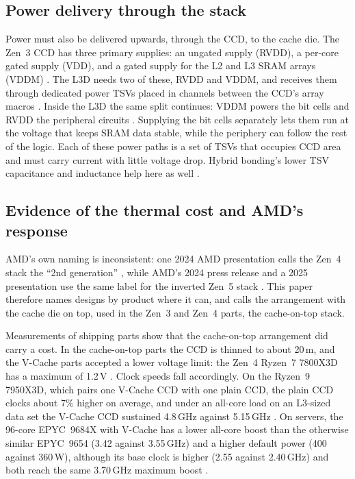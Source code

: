 \subsection{Power delivery through the stack}
Power must also be delivered upwards, through the CCD, to the cache die. The Zen~3 CCD has three primary supplies: an ungated supply (RVDD), a per-core gated supply (VDD), and a gated supply for the L2 and L3 SRAM arrays (VDDM) \cite[slide~23]{wuu2022vcache}. The L3D needs two of these, RVDD and VDDM, and receives them through dedicated power TSVs placed in channels between the CCD's array macros \cite[slide~24]{wuu2022vcache}. Inside the L3D the same split continues: VDDM powers the bit cells and RVDD the peripheral circuits \cite[slide~25]{wuu2022vcache}. Supplying the bit cells separately lets them run at the voltage that keeps SRAM data stable, while the periphery can follow the rest of the logic. Each of these power paths is a set of TSVs that occupies CCD area and must carry current with little voltage drop. Hybrid bonding's lower TSV capacitance and inductance help here as well \cite{swaminathanAdvancedPackagingEnabling2021}.

\subsection{Evidence of the thermal cost and AMD's response}
\label{sec:thermal-evidence}
AMD's own naming is inconsistent: one 2024 AMD presentation calls the Zen~4 stack the ``2nd generation'' \cite{alam2ndGeneration3D2024}, while AMD's 2024 press release and a 2025 presentation use the same label for the inverted Zen~5 stack \cite{advancedmicrodevicesinc.GamingLegendContinues2024,lambertHeterogenousIntegrationHigh2025}. This paper therefore names designs by product where it can, and calls the arrangement with the cache die on top, used in the Zen~3 and Zen~4 parts, the cache-on-top stack.

Measurements of shipping parts show that the cache-on-top arrangement did carry a cost. In the cache-on-top parts the CCD is thinned to about 20\,\textmu m, and the V-Cache parts accepted a lower voltage limit: the Zen~4 Ryzen~7 7800X3D has a maximum of 1.2\,V \cite{cozmaAMDs9800X3D2nd2024}. Clock speeds fall accordingly. On the Ryzen~9 7950X3D, which pairs one V-Cache CCD with one plain CCD, the plain CCD clocks about 7\% higher on average, and under an all-core load on an L3-sized data set the V-Cache CCD sustained 4.8\,GHz against 5.15\,GHz \cite{lamAMDs7950X3DZen2023}. On servers, the 96-core EPYC~9684X with V-Cache has a lower all-core boost than the otherwise similar EPYC~9654 (3.42 against 3.55\,GHz) and a higher default power (400 against 360\,W), although its base clock is higher (2.55 against 2.40\,GHz) and both reach the same 3.70\,GHz maximum boost \cite{advancedmicrodevicesinc.AMDEPYC90042023}.

